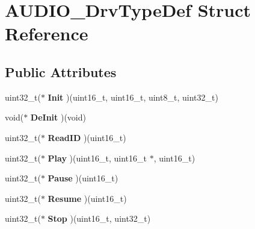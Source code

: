 \hypertarget{struct_a_u_d_i_o___drv_type_def}{}\section{A\+U\+D\+I\+O\+\_\+\+Drv\+Type\+Def Struct Reference}
\label{struct_a_u_d_i_o___drv_type_def}
\subsection*{Public Attributes}
\begin{DoxyCompactItemize}
\item 
\mbox{\label{struct_a_u_d_i_o___drv_type_def_a4998954dbaf3bee970383bfbf7a32636}} 
uint32\+\_\+t($\ast$ {\bfseries Init} )(uint16\+\_\+t, uint16\+\_\+t, uint8\+\_\+t, uint32\+\_\+t)
\item 
\mbox{\label{struct_a_u_d_i_o___drv_type_def_a1b4189f6f6cf3c9af24f89cc70cd6fcf}} 
void($\ast$ {\bfseries De\+Init} )(void)
\item 
\mbox{\label{struct_a_u_d_i_o___drv_type_def_a9cc9d0e24a9a43655d9a784518d998a2}} 
uint32\+\_\+t($\ast$ {\bfseries Read\+ID} )(uint16\+\_\+t)
\item 
\mbox{\label{struct_a_u_d_i_o___drv_type_def_aaf08783572f1aee52f1fb936213534b0}} 
uint32\+\_\+t($\ast$ {\bfseries Play} )(uint16\+\_\+t, uint16\+\_\+t $\ast$, uint16\+\_\+t)
\item 
\mbox{\label{struct_a_u_d_i_o___drv_type_def_ade4f9e3739bb7a107f5d8a84a1c62fbe}} 
uint32\+\_\+t($\ast$ {\bfseries Pause} )(uint16\+\_\+t)
\item 
\mbox{\label{struct_a_u_d_i_o___drv_type_def_ab18ab060f3f2d9ef4575aed502b33a54}} 
uint32\+\_\+t($\ast$ {\bfseries Resume} )(uint16\+\_\+t)
\item 
\mbox{\label{struct_a_u_d_i_o___drv_type_def_aed402695769bf12578979071a0c3d85b}} 
uint32\+\_\+t($\ast$ {\bfseries Stop} )(uint16\+\_\+t, uint32\+\_\+t)
\item 

\end{DoxyCompactItemize}
